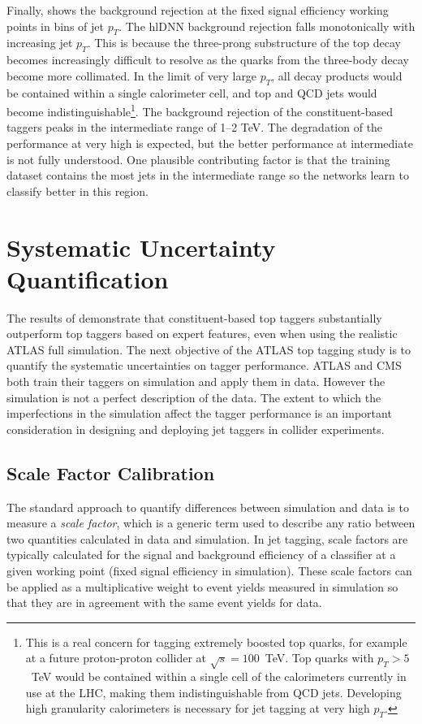 Finally,  shows the background rejection at the fixed signal efficiency working points in bins of jet $p_T$.
The hlDNN background rejection falls monotonically with increasing jet $p_T$.
This is because the three-prong substructure of the top decay becomes increasingly difficult to resolve as the quarks from the three-body decay become more collimated.
In the limit of very large $p_T$, all decay products would be contained within a single calorimeter cell, and top and QCD jets would become indistinguishable\footnote{This is a real concern for tagging extremely boosted top quarks, for example at a future proton-proton collider at $\sqrt{s} = 100$~TeV. Top quarks with $p_T > 5$~TeV would be contained within a single cell of the calorimeters currently in use at the LHC, making them indistinguishable from QCD jets. Developing high granularity calorimeters is necessary for jet tagging at very high $p_T$.}.
The background rejection of the constituent-based taggers peaks in the intermediate \pt range of 1--2 TeV.
The degradation of the performance at very high \pt is expected, but the better performance at intermediate \pt is not fully understood.
One plausible contributing factor is that the training dataset contains the most jets in the intermediate \pt range so the networks learn to classify better in this region.

\section{Systematic Uncertainty Quantification}
\label{sec:systematic-uq}

The results of  demonstrate that constituent-based top taggers substantially outperform top taggers based on expert features, even when using the realistic ATLAS full simulation.
The next objective of the ATLAS top tagging study is to quantify the systematic uncertainties on tagger performance.
ATLAS and CMS both train their taggers on simulation and apply them in data.
However the simulation is not a perfect description of the data.
The extent to which the imperfections in the simulation affect the tagger performance is an important consideration in designing and deploying jet taggers in collider experiments.

\subsection{Scale Factor Calibration}

The standard approach to quantify differences between simulation and data is to measure a \textit{scale factor}, which is a generic term used to describe any ratio between two quantities calculated in data and simulation.
In jet tagging, scale factors are typically calculated for the signal and background efficiency of a classifier at a given working point (fixed signal efficiency in simulation).
These scale factors can be applied as a multiplicative weight to event yields measured in simulation so that they are in agreement with the same event yields for data.

